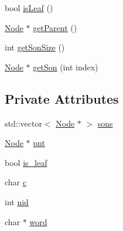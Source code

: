 \begin{DoxyCompactItemize}
\item 
bool \hyperlink{class_node_a3a61dca67d5ad06cacb8c48eb6374973}{is\+Leaf} ()
\item 
\hyperlink{class_node}{Node} $\ast$ \hyperlink{class_node_a8e09d5e4fd1497c0964a0923e6f77e72}{get\+Parent} ()
\item 
int \hyperlink{class_node_a2688d78f486e0cb23d941075f7c5995f}{get\+Son\+Size} ()
\item 
\hyperlink{class_node}{Node} $\ast$ \hyperlink{class_node_ababf48005071dfd80d782f4a78a0adf7}{get\+Son} (int index)
\end{DoxyCompactItemize}
\subsection*{Private Attributes}
\begin{DoxyCompactItemize}
\item 
std\+::vector$<$ \hyperlink{class_node}{Node} $\ast$ $>$ \hyperlink{class_node_a07c804c43704f42d46ff0434bebd811a}{sons}
\item 
\hyperlink{class_node}{Node} $\ast$ \hyperlink{class_node_a205e65c58cfc162fa74ffcf9e887471f}{pnt}
\item 
bool \hyperlink{class_node_a3e5449ec9e41ba98cbaf8f3a993d03c4}{is\+\_\+leaf}
\item 
char \hyperlink{class_node_a61aff5c2aea5a34a609ffcbdb88fde6f}{c}
\item 
int \hyperlink{class_node_a7282da2b6b3eebdb62b36d416c68b8f4}{nid}
\item 
char $\ast$ \hyperlink{class_node_afa6ccc6414d3e0bcacb715dcdf764bca}{word}
\end{DoxyCompactItemize}


